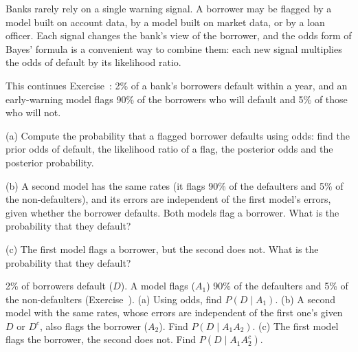 
\begin{problem}
	\begin{context}
		Banks rarely rely on a single warning signal. A borrower may be flagged
		by a model built on account data, by a model built on market data, or by
		a loan officer. Each signal changes the bank's view of the borrower, and
		the odds form of Bayes' formula is a convenient way to combine them: each
		new signal multiplies the odds of default by its likelihood ratio.
	\end{context}
	This continues Exercise~: 2\% of a bank's borrowers
	default within a year, and an early-warning model flags 90\% of the
	borrowers who will default and 5\% of those who will not.

	(a) Compute the probability that a flagged borrower defaults using odds:
	find the prior odds of default, the likelihood ratio of a flag, the
	posterior odds and the posterior probability.

	(b) A second model has the same rates (it flags 90\% of the defaulters and
	5\% of the non-defaulters), and its errors are independent of the first
	model's errors, given whether the borrower defaults. Both models flag a
	borrower. What is the probability that they default?

	(c) The first model flags a borrower, but the second does not. What is the
	probability that they default?
\end{problem}

\begin{slideproblem}
	2\% of borrowers default ($D$). A model flags ($A_1$) 90\% of the
	defaulters and 5\% of the non-defaulters (Exercise~).
	(a) Using odds, find $P(D\mid A_1)$. (b) A second model with the same
	rates, whose errors are independent of the first one's given $D$ or $D^c$,
	also flags the borrower ($A_2$). Find $P(D\mid A_1A_2)$. (c) The first
	model flags the borrower, the second does not. Find $P(D\mid A_1A_2^c)$.
\end{slideproblem}

